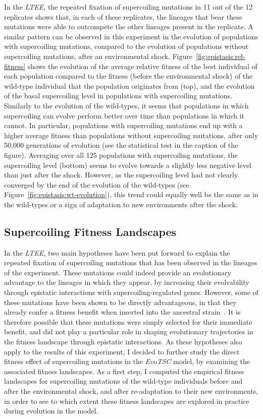 In the \emph{LTEE}, the repeated fixation of supercoiling mutations in 11 out of the 12 replicates shows that, in each of these replicates, the lineages that bear these mutations were able to outcompete the other lineages present in the replicate.
A similar pattern can be observed in this experiment in the evolution of populations with supercoiling mutations, compared to the evolution of populations without supercoiling mutations, after an environmental shock.
Figure~\ref{fig:epistasis:rel-fitness} shows the evolution of the average relative fitness of the best individual of each population compared to the fitness (before the environmental shock) of the wild-type individual that the population originates from (top), and the evolution of the basal supercoiling level in populations with supercoiling mutations.
Similarly to the evolution of the wild-types, it seems that populations in which supercoiling can evolve perform better over time than populations in which it cannot.
In particular, populations with supercoiling mutations end up with a higher average fitness than populations without supercoiling mutations, after only 50,000 generations of evolution (see the statistical test in the caption of the figure).
Averaging over all 125 populations with supercoiling mutations, the supercoiling level (bottom) seems to evolve towards a slightly less negative level than just after the shock.
However, as the supercoiling level had not clearly converged by the end of the evolution of the wild-types (see Figure~\ref{fig:epistasis:wt-evolution}), this trend could equally well be the same as in the wild-types or a sign of adaptation to new environments after the shock.

\subsection{Supercoiling Fitness Landscapes}

In the \emph{LTEE}, two main hypotheses have been put forward to explain the repeated fixation of supercoiling mutations that has been observed in the lineages of the experiment.
These mutations could indeed provide an evolutionary advantage to the lineages in which they appear, by increasing their evolvability through epistatic interactions with supercoiling-regulated genes.
However, some of these mutations have been shown to be directly advantageous, in that they already confer a fitness benefit when inserted into the ancestral strain~\citep{crozat2005}.
It is therefore possible that these mutations were simply selected for their immediate benefit, and did not play a particular role in shaping evolutionary trajectories in the fitness landscape through epistatic interactions.
As these hypotheses also apply to the results of this experiment, I decided to further study the direct fitness effect of supercoiling mutations in the \emph{EvoTSC} model, by examining the associated fitness landscapes.
As a first step, I computed the empirical fitness landscapes for supercoiling mutations of the wild-type individuals before and after the environmental shock, and after re-adaptation to their new environments, in order to see to which extent these fitness landscapes are explored in practice during evolution in the model.

